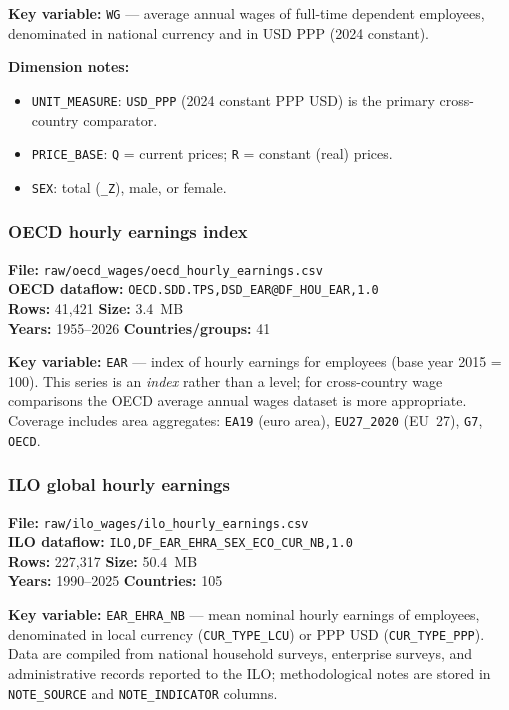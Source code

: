\documentclass[11pt,a4paper]{article}
\newcommand{\code}[1]{\texttt{#1}}
\begin{document}
\noindent\textbf{Key variable:} \code{WG} --- average annual wages of full-time dependent employees, denominated in national currency and in USD PPP (2024 constant).

\noindent\textbf{Dimension notes:}
\begin{itemize}[noitemsep]
    \item \texttt{UNIT\_MEASURE}: \texttt{USD\_PPP} (2024 constant PPP USD) is the primary cross-country comparator.
    \item \texttt{PRICE\_BASE}: \texttt{Q} = current prices; \texttt{R} = constant (real) prices.
    \item \texttt{SEX}: total (\texttt{\_Z}), male, or female.
\end{itemize}

\subsubsection{OECD hourly earnings index}

\textbf{File:} \texttt{raw/oecd\_wages/oecd\_hourly\_earnings.csv}\\
\textbf{OECD dataflow:} \texttt{OECD.SDD.TPS,DSD\_EAR@DF\_HOU\_EAR,1.0}\\
\textbf{Rows:} 41{,}421 \quad \textbf{Size:} 3.4~MB\\
\textbf{Years:} 1955--2026 \quad \textbf{Countries/groups:} 41

\noindent\textbf{Key variable:} \code{EAR} --- index of hourly earnings for employees (base year 2015 = 100).  This series is an \emph{index} rather than a level; for cross-country wage comparisons the OECD average annual wages dataset is more appropriate.  Coverage includes area aggregates: \texttt{EA19} (euro area), \texttt{EU27\_2020} (EU~27), \texttt{G7}, \texttt{OECD}.

\subsubsection{ILO global hourly earnings}

\textbf{File:} \texttt{raw/ilo\_wages/ilo\_hourly\_earnings.csv}\\
\textbf{ILO dataflow:} \texttt{ILO,DF\_EAR\_EHRA\_SEX\_ECO\_CUR\_NB,1.0}\\
\textbf{Rows:} 227{,}317 \quad \textbf{Size:} 50.4~MB\\
\textbf{Years:} 1990--2025 \quad \textbf{Countries:} 105

\noindent\textbf{Key variable:} \code{EAR\_EHRA\_NB} --- mean nominal hourly earnings of employees, denominated in local currency (\texttt{CUR\_TYPE\_LCU}) or PPP USD (\texttt{CUR\_TYPE\_PPP}).  Data are compiled from national household surveys, enterprise surveys, and administrative records reported to the ILO; methodological notes are stored in \texttt{NOTE\_SOURCE} and \texttt{NOTE\_INDICATOR} columns.
\end{document}
